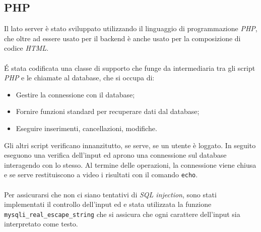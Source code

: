 \subsection{PHP}
Il lato server è stato sviluppato utilizzando il linguaggio di programmazione \textit{PHP}, che oltre
ad essere usato per il backend è anche usato per la composizione di codice \textit{HTML}.\\
\\
É stata codificata una classe di supporto che funge da intermediaria tra gli script \textit{PHP} e le
chiamate al database, che si occupa di:
\begin{itemize}
	\item Gestire la connessione con il database;
	\item Fornire funzioni standard per recuperare dati dal database;
	\item Eseguire inserimenti, cancellazioni, modifiche.
\end{itemize}
Gli altri script verificano innanzitutto, se serve, se un utente è loggato. In seguito eseguono una
verifica dell'input ed aprono una connessione sul database interagendo con lo stesso. Al termine delle
operazioni, la connessione viene chiusa e se serve restituiscono a video i risultati con il comando
\texttt{echo}.\\
\\
Per assicurarsi che non ci siano tentativi di \textit{SQL injection}, sono stati implementati il controllo dell'input ed e stata utilizzata la funzione \texttt{mysqli{\_}real{\_}escape{\_}string} che si assicura che ogni carattere dell'input sia interpretato come testo.

